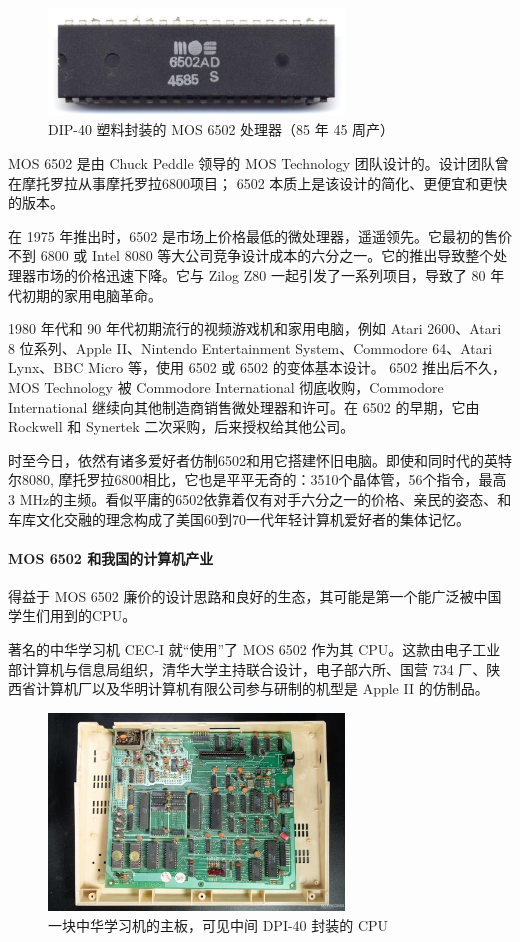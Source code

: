 \begin{figure}[H]
  \centering
  \includegraphics[width=0.7\textwidth]{image/MOS_6502AD_4585_top.jpeg}
  \caption{DIP-40 塑料封装的 MOS 6502 处理器（85 年 45 周产）}
\end{figure}

MOS 6502 是由 Chuck Peddle 领导的 MOS Technology 团队设计的。设计团队曾在摩托罗拉从事摩托罗拉6800项目； 6502 本质上是该设计的简化、更便宜和更快的版本。

在 1975 年推出时，6502 是市场上价格最低的微处理器，遥遥领先。它最初的售价不到 6800 或 Intel 8080 等大公司竞争设计成本的六分之一。它的推出导致整个处理器市场的价格迅速下降。它与 Zilog Z80 一起引发了一系列项目，导致了 80 年代初期的家用电脑革命。

1980 年代和 90 年代初期流行的视频游戏机和家用电脑，例如 Atari 2600、Atari 8 位系列、Apple II、Nintendo Entertainment System、Commodore 64、Atari Lynx、BBC Micro 等，使用 6502 或 6502 的变体基本设计。 6502 推出后不久，MOS Technology 被 Commodore International 彻底收购，Commodore International 继续向其他制造商销售微处理器和许可。在 6502 的早期，它由 Rockwell 和 Synertek 二次采购，后来授权给其他公司。

时至今日，依然有诸多爱好者仿制6502和用它搭建怀旧电脑。即使和同时代的英特尔8080, 摩托罗拉6800相比，它也是平平无奇的：3510个晶体管，56个指令，最高3 MHz的主频。看似平庸的6502依靠着仅有对手六分之一的价格、亲民的姿态、和车库文化交融的理念构成了美国60到70一代年轻计算机爱好者的集体记忆。

\paragraph{MOS 6502 和我国的计算机产业} 得益于 MOS 6502 廉价的设计思路和良好的生态，其可能是第一个能广泛被中国学生们用到的CPU。

著名的中华学习机 CEC-I 就“使用”了 MOS 6502 作为其 CPU。这款由电子工业部计算机与信息局组织，清华大学主持联合设计，电子部六所、国营 734 厂、陕西省计算机厂以及华明计算机有限公司参与研制的机型是 Apple II 的仿制品。

\begin{figure}[H]
  \centering
  \includegraphics[width=0.7\textwidth]{image/CIC1.jpeg}
  \caption{一块中华学习机的主板，可见中间 DPI-40 封装的 CPU}
\end{figure}

